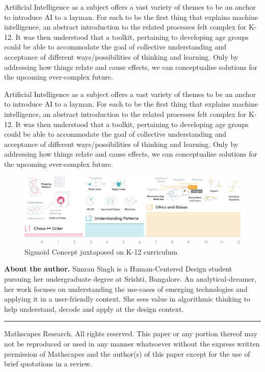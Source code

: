 \documentclass	[a4paper,11pt, hidelinks]{article}
\theoremstyle{definition}
\newcommand{\mscpy}{\raisebox{.25ex}{\copyright} Mathscapes Research}
\begin{document}
Artificial Intelligence as a subject offers a vast variety of themes to be an anchor to introduce AI to a layman. For each to be the first thing that explains machine intelligence, an abstract introduction to the related processes felt complex for K-12. It was then understood that a toolkit, pertaining to developing age groups could be able to accommodate the goal of collective understanding and acceptance of different ways/possibilities of thinking and learning. Only by addressing how things relate and cause effects, we can conceptualise solutions for the upcoming ever-complex future.

Artificial Intelligence as a subject offers a vast variety of themes to be an anchor to introduce AI to a layman. For each to be the first thing that explains machine intelligence, an abstract introduction to the related processes felt complex for K-12. It was then understood that a toolkit, pertaining to developing age groups could be able to accommodate the goal of collective understanding and acceptance of different ways/possibilities of thinking and learning. Only by addressing how things relate and cause effects, we can conceptualise solutions for the upcoming ever-complex future.

\begin{figure}[h]
  \center
  \includegraphics[width=\textwidth]{sigmoid_concept.png}
  \caption{Sigmoid Concept juxtaposed on K-12 curriculum}
\end{figure}




\vspace{1cm}
\textbf{About the author.} Simran Singh is a Human-Centered Design student pursuing her undergraduate degree at Srishti, Bangalore. An analytical-dreamer, her work focuses on understanding the use-cases of emerging technologies and applying it in a user-friendly context. She sees value in algorithmic thinking to help understand, decode and apply at the design context.

\vspace*{\fill}
\rule{\textwidth}{0.4pt}
\footnotesize \mscpy. All rights reserved. This paper or any portion thereof may not be reproduced or used in any manner whatsoever without the express written permission of Mathscapes and the author(s) of this paper except for the use of brief quotations in a review.
\end{document}
